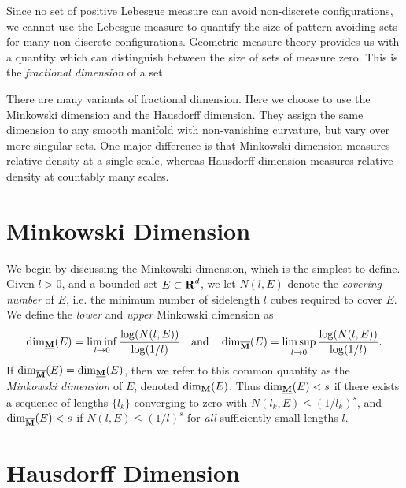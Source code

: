 Since no set of positive Lebesgue measure can avoid non-discrete configurations, we cannot use the Lebesgue measure to quantify the size of pattern avoiding sets for many non-discrete configurations. Geometric measure theory provides us with a quantity which can distinguish between the size of sets of measure zero. This is the \emph{fractional dimension} of a set.

There are many variants of fractional dimension. Here we choose to use the Minkowski dimension and the Hausdorff dimension. They assign the same dimension to any smooth manifold with non-vanishing curvature, but vary over more singular sets. One major difference is that Minkowski dimension measures relative density at a single scale, whereas Hausdorff dimension measures relative density at countably many scales.









\section{Minkowski Dimension}

We begin by discussing the Minkowski dimension, which is the simplest to define. Given $l > 0$, and a bounded set $E \subset \operatorname{\mathbf{R}}^d$, we let $N(l,E)$ denote the \emph{covering number} of $E$, i.e. the minimum number of sidelength $l$ cubes required to cover $E$. We define the \emph{lower} and \emph{upper} Minkowski dimension as
%
\[ \operatorname{\dim_{\underline{\mathbf{M}}}}(E) = \liminf_{l \to 0} \frac{\log(N(l,E))}{\log(1/l)} \quad\text{and}\quad \operatorname{\dim_{\overline{\mathbf{M}}}}(E) = \limsup_{l \to 0} \frac{\log(N(l,E))}{\log(1/l)}. \]
%
If $\operatorname{\dim_{\overline{\mathbf{M}}}}(E) = \operatorname{\dim_{\underline{\mathbf{M}}}}(E)$, then we refer to this common quantity as the \emph{Minkowski dimension} of $E$, denoted $\operatorname{\dim_{\mathbf{M}}}(E)$. Thus $\operatorname{\dim_{\underline{\mathbf{M}}}}(E) < s$ if there exists a sequence of lengths $\{ l_k \}$ converging to zero with $N(l_k,E) \leq (1/l_k)^s$, and $\operatorname{\dim_{\overline{\mathbf{M}}}}(E) < s$ if $N(l,E) \leq (1/l)^s$ for \emph{all} sufficiently small lengths $l$.

\section{Hausdorff Dimension}


